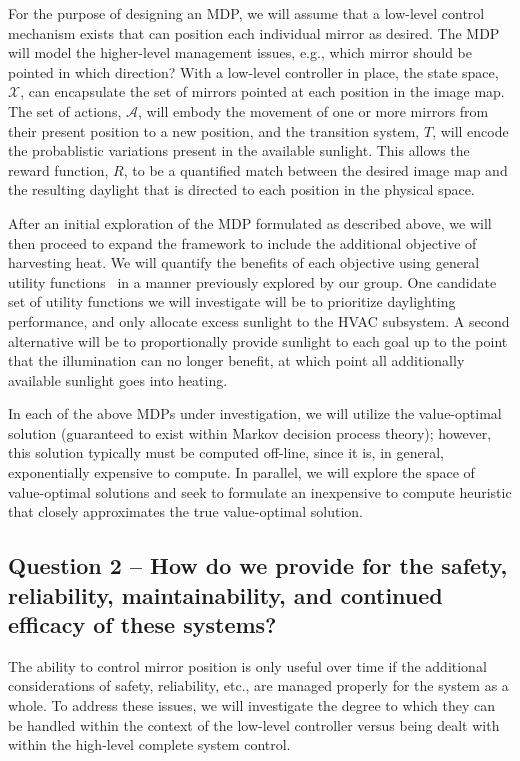 For the purpose of designing an MDP, we will assume that a low-level
control mechanism exists that can position each individual mirror as
desired.  The MDP will model the higher-level management issues, e.g.,
which mirror should be pointed in which direction?
With a low-level controller in place, the state space, $\mathcal{X}$,
can encapsulate the set of mirrors pointed at each position in
the image map.  The set of actions, $\mathcal{A}$, will embody the movement
of one or more mirrors from their present position to a new position,
and the transition system, $T$, will encode the probablistic variations
present in the available sunlight.  This allows the reward function, $R$,
to be a quantified match between the desired image map and the resulting
daylight that is directed to each position in the physical space.

After an initial exploration of the MDP formulated as described above,
we will then proceed to expand the framework to include the additional
objective of harvesting heat.  We will quantify the benefits of each
objective using general utility functions~\cite{tggs10} in a manner previously
explored by our group. One candidate set of utility functions we will
investigate will be to prioritize daylighting performance, and only
allocate excess sunlight to the HVAC subsystem. A second alternative
will be to proportionally provide sunlight to each goal up to the point
that the illumination can no longer benefit, at which point all additionally
available sunlight goes into heating.

In each of the above MDPs under investigation, we will utilize the
value-optimal solution (guaranteed to exist within Markov decision process
theory); however, this solution typically must be computed off-line, since
it is, in general, exponentially expensive to compute.  In parallel, we
will explore the space of value-optimal solutions and seek to formulate
an inexpensive to compute heuristic that closely approximates the
true value-optimal solution.

\subsection{Question 2 -- How do we provide for the safety, reliability,
maintainability, and continued efficacy of these systems?}

The ability to control mirror position is only useful over time if
the additional considerations of safety, reliability, etc., are managed
properly for the system as a whole. To address these issues, we will
investigate the degree to which they can be handled within the context
of the low-level controller versus being dealt with within the high-level
complete system control.

